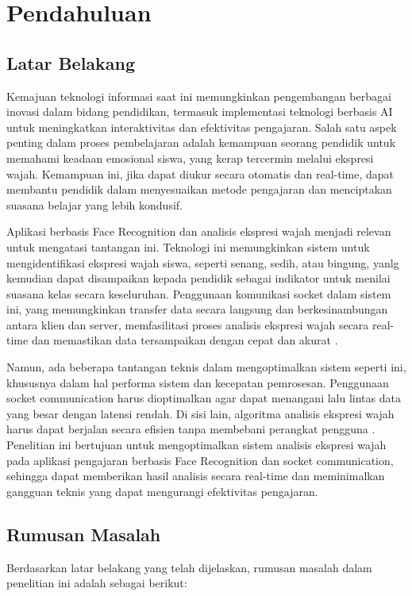 \chapter{Pendahuluan}
\section{Latar Belakang}
\qquad Kemajuan teknologi informasi saat ini memungkinkan pengembangan berbagai inovasi dalam bidang pendidikan, termasuk implementasi teknologi berbasis AI untuk meningkatkan interaktivitas dan efektivitas pengajaran. Salah satu aspek penting dalam proses pembelajaran adalah kemampuan seorang pendidik untuk memahami keadaan emosional siswa, yang kerap tercermin melalui ekspresi wajah. Kemampuan ini, jika dapat diukur secara otomatis dan real-time, dapat membantu pendidik dalam menyesuaikan metode pengajaran dan menciptakan suasana belajar yang lebih kondusif.

Aplikasi berbasis Face Recognition dan analisis ekspresi wajah menjadi relevan untuk mengatasi tantangan ini. Teknologi ini memungkinkan sistem untuk mengidentifikasi ekspresi wajah siswa, seperti senang, sedih, atau bingung, yanlg kemudian dapat disampaikan kepada pendidik sebagai indikator untuk menilai suasana kelas secara keseluruhan. Penggunaan komunikasi socket dalam sistem ini, yang memungkinkan transfer data secara langsung dan berkesinambungan antara klien dan server, memfasilitasi proses analisis ekspresi wajah secara real-time dan memastikan data tersampaikan dengan cepat dan akurat \parencite{ogundeyiWebSocketRealTime2019}.

Namun, ada beberapa tantangan teknis dalam mengoptimalkan sistem seperti ini, khususnya dalam hal performa sistem dan kecepatan pemrosesan. Penggunaan socket communication harus dioptimalkan agar dapat menangani lalu lintas data yang besar dengan latensi rendah. Di sisi lain, algoritma analisis ekspresi wajah harus dapat berjalan secara efisien tanpa membebani perangkat pengguna \parencite{phankokkruadRealtimeFaceRecognition2016a}. Penelitian ini bertujuan untuk mengoptimalkan sistem analisis ekspresi wajah pada aplikasi pengajaran berbasis Face Recognition dan socket communication, sehingga dapat memberikan hasil analisis secara real-time dan meminimalkan gangguan teknis yang dapat mengurangi efektivitas pengajaran.

\section{Rumusan Masalah}
{Berdasarkan latar belakang yang telah dijelaskan, rumusan masalah dalam penelitian ini adalah sebagai berikut:}

